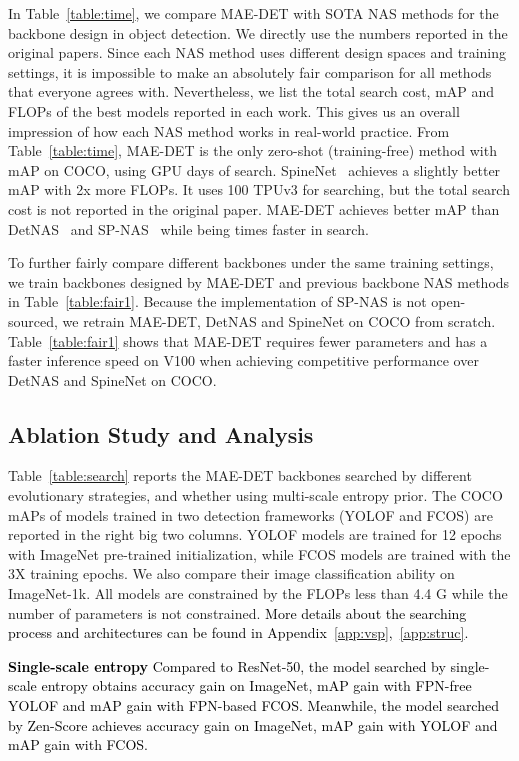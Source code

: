 \documentclass[nohyperref]{article}
\theoremstyle{plain}
\theoremstyle{definition}
\theoremstyle{remark}
\begin{document}
In Table~\ref{table:time}, we compare MAE-DET with SOTA NAS methods for the backbone design in object detection. We directly use the numbers reported in the original papers. Since each NAS method uses different design spaces and training settings, it is impossible to make an absolutely fair comparison for all methods that everyone agrees with. Nevertheless, we list the total search cost, mAP and FLOPs of the best models reported in each work. This gives us an overall impression of how each NAS method works in real-world practice. From Table~\ref{table:time}, MAE-DET is the only zero-shot (training-free) method with  mAP on COCO, using  GPU days of search. SpineNet~\citep{spinenet} achieves a slightly better mAP with 2x more FLOPs. It uses 100 TPUv3 for searching, but the total search cost is not reported in the original paper. MAE-DET achieves better mAP than DetNAS~\citep{detnas} and SP-NAS~\citep{spnas} while being  times faster in search.


To further fairly compare different backbones under the same training settings, we train backbones designed by MAE-DET and previous backbone NAS methods in Table~\ref{table:fair1}. Because the implementation of SP-NAS is not open-sourced, we retrain MAE-DET, DetNAS and SpineNet on COCO from scratch. Table~\ref{table:fair1} shows that MAE-DET requires fewer parameters and has a faster inference speed on V100 when achieving competitive performance over DetNAS and SpineNet on COCO.



\subsection{Ablation Study and Analysis}
\label{sub:ablation}

Table~\ref{table:search} reports the MAE-DET backbones searched by different evolutionary strategies, and whether using multi-scale entropy prior. The COCO mAPs of models trained in two detection frameworks (YOLOF and FCOS) are reported in the right big two columns. YOLOF models are trained for 12 epochs with ImageNet pre-trained initialization, while FCOS models are trained with the 3X training epochs. We also compare their image classification ability on ImageNet-1k. All models are constrained by the FLOPs less than 4.4 G while the number of parameters is not constrained. \textcolor{black}{More details about the searching process and architectures can be found in Appendix~\ref{app:vsp},~\ref{app:struc}.}

\noindent\textcolor{black}{\textbf{Single-scale entropy} 
Compared to ResNet-50, the model searched by single-scale entropy obtains  accuracy gain on ImageNet,  mAP gain with FPN-free YOLOF and  mAP gain with FPN-based FCOS. Meanwhile, the model searched by Zen-Score achieves  accuracy gain on ImageNet,  mAP gain with YOLOF and  mAP gain with FCOS.}
\end{document}

